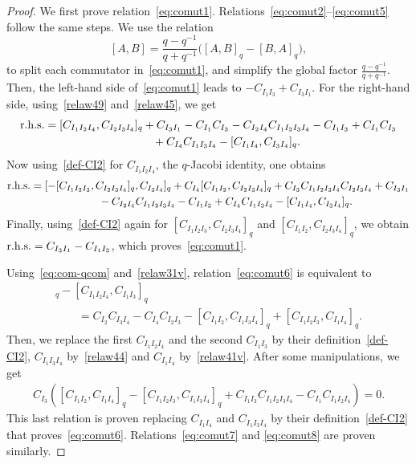 \documentclass[10pt,a4paper]{amsart}
\numberwithin{equation}{section}
\theoremstyle{definition}
\begin{document}
\begin{proof}
We first prove relation~\eqref{eq:comut1}. Relations~\eqref{eq:comut2}--\eqref{eq:comut5} follow the same steps.
We use the relation
\begin{equation}\label{eq:com-qcom}
[A,B] = \frac{q-q^{-1}}{q+q^{-1}} \big( [A , B]_q -[B , A]_q\big) ,
\end{equation}
to split each commutator in~\eqref{eq:comut1}, and simplify the global factor $\frac{q-q^{-1}}{q+q^{-1}}$.
Then, the left-hand side of~\eqref{eq:comut1} leads to $-C_{I_1I_3}+C_{I_3I_1}$. For the right-hand side, using~\eqref{relaw49} and~\eqref{relaw45}, we get
\begin{gather*}
{\rm r.h.s.}= [C_{I_1I_2I_4},C_{I_2I_3I_4} ]_q +C_{I_3I_1} -C_{I_1}C_{I_3}- C_{I_2I_4}C_{I_1I_2I_3I_4}
 -C_{I_1I_3}+C_{I_1}C_{I_3} \\
\hphantom{{\rm r.h.s.}=}{}+C_{I_4}C_{I_1I_3I_4}-[C_{I_1I_4} ,C_{I_3I_4}]_q.
\end{gather*}
Now using~\eqref{def-CI2} for $C_{I_1I_2I_4}$, the $q$-Jacobi identity, one obtains
 \begin{gather*}
{\rm r.h.s.}= [-[C_{I_1I_2I_3},C_{I_2I_3I_4} ]_q,C_{I_3I_4} ]_q +C_{I_4}[C_{I_1I_2},C_{I_2I_3I_4}]_q+C_{I_3}C_{I_1I_2I_3I_4}C_{I_2I_3I_4}+C_{I_3I_1}\\
\hphantom{{\rm r.h.s.}=}{} - C_{I_2I_4}C_{I_1I_2I_3I_4}
 -C_{I_1I_3}+C_{I_4}C_{I_1I_3I_4}
-[C_{I_1I_4} ,C_{I_3I_4}]_q.
 \end{gather*}
Finally, using~\eqref{def-CI2} again for $[C_{I_1I_2I_3},C_{I_2I_3I_4} ]_q$ and $[C_{I_1I_2},C_{I_2I_3I_4}]_q$, we obtain ${\rm r.h.s.}=C_{I_3I_1} -C_{I_1I_3}$, which proves~\eqref{eq:comut1}.

Using~\eqref{eq:com-qcom} and~\eqref{relaw31v}, relation~\eqref{eq:comut6} is equivalent to
\begin{gather*}
[C_{I_1I_3}, C_{I_1I_2I_4} ]_q - [C_{I_1I_2I_4},C_{I_1I_3} ]_q\\
\qquad= C_{I_2}C_{I_3I_4} - C_{I_4}C_{I_2I_3}
-[C_{I_1I_2},C_{I_1I_3I_4}]_q+[C_{I_1I_2I_3},C_{I_1I_4}]_q.
 \end{gather*}
Then, we replace the first $C_{I_1I_2I_4}$ and the second $C_{I_1I_3}$ by their definition~\eqref{def-CI2},
$C_{I_1I_3I_4}$ by~\eqref{relaw44} and $C_{I_1I_4}$ by~\eqref{relaw41v}. After some manipulations, we get
\begin{gather*}
C_{I_3}( [C_{I_1I_2},C_{I_1I_4} ]_q -[C_{I_1I_2I_3},C_{I_1I_3I_4}]_q
+ C_{I_1I_3}C_{I_1I_2I_3I_4} - C_{I_1}C_{I_1I_2I_4})=0.
 \end{gather*}
This last relation is proven replacing $C_{I_1I_4}$ and $C_{I_1I_3I_4}$ by their definition~\eqref{def-CI2} that proves~\eqref{eq:comut6}.
Relations~\eqref{eq:comut7} and \eqref{eq:comut8} are proven similarly.
\end{proof}
\end{document}
